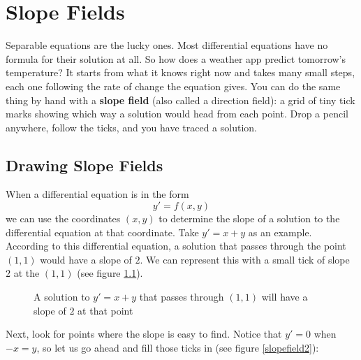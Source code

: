 \chapter{Slope Fields}

Separable equations are the lucky ones. Most differential equations have no
formula for their solution at all. So how does a weather app predict tomorrow's
temperature? It starts from what it knows right now and takes many small
steps, each one following the rate of change the equation gives. You can do
the same thing by hand with a \textbf{slope field} (also called a
direction field): a grid of tiny tick marks showing
which way a solution would head from each point. Drop a pencil anywhere, follow
the ticks, and you have traced a solution. 

\section{Drawing Slope Fields}
When a differential equation is in the form
$$y' = f(x,y)$$
we can use the coordinates $(x,y)$ to determine the slope of a solution to the 
differential equation at that coordinate. Take $y' = x + y$ as an example. 
According to this differential equation, a solution that passes through the 
point $(1, 1)$ would have a slope of $2$. We can represent this with a small 
tick of slope $2$ at the $(1, 1)$ (see figure \ref{slopefield1}). 

\begin{figure}[H]
\centering
    \caption{A solution to $y' = x + y$ that passes through $(1,1)$ will have 
    a slope of $2$ at that point}
    \label{slopefield1}
\end{figure}

Next, look for points where the slope is easy to find. Notice that $y' = 0$ when $-x = y$, so let us go ahead and fill those ticks in 
(see figure \ref{slopefield2}):

